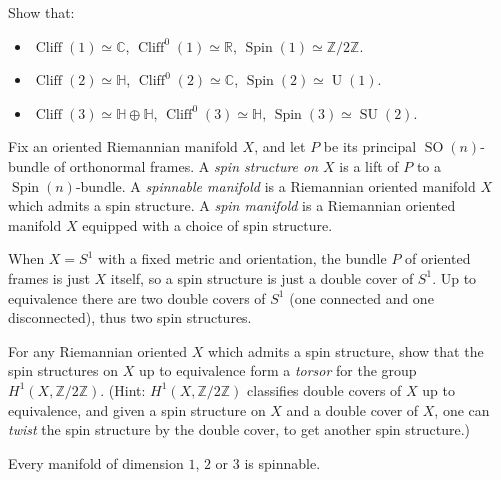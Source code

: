 \documentclass[12pt,letterpaper,reqno]{article}
\numberwithin{equation}{section}
\newcommand{\R}{\ensuremath{\mathbb R}}
\newcommand{\C}{\ensuremath{\mathbb C}}
\newcommand{\Z}{\ensuremath{\mathbb Z}}
\newcommand{\bbH}{\ensuremath{\mathbb H}}
\newcommand{\ti}[1]{\textit{#1}}
\DeclareMathOperator{\Spin}{Spin}
\DeclareMathOperator{\SO}{SO}
\DeclareMathOperator{\SU}{SU}
\DeclareMathOperator{\U}{U}
\DeclareMathOperator{\Cliff}{Cliff}
\begin{document}
\begin{exercise} Show that:
\begin{itemize}
\item $\Cliff(1) \simeq \C$, $\Cliff^0(1) \simeq \R$, $\Spin(1) \simeq \Z / 2\Z$.
\item $\Cliff(2) \simeq \bbH$, $\Cliff^0(2) \simeq \C$, $\Spin(2) \simeq \U(1)$.
\item $\Cliff(3) \simeq \bbH \oplus \bbH$, $\Cliff^0(3) \simeq \bbH$, $\Spin(3) \simeq \SU(2)$.
\end{itemize}
\end{exercise}

\begin{defn} Fix an oriented Riemannian manifold $X$, 
and let $P$ be its principal $\SO(n)$-bundle
of orthonormal frames. A \ti{spin structure on $X$} is a lift of $P$ to a $\Spin(n)$-bundle.
A \ti{spinnable manifold} is a Riemannian oriented manifold $X$ which
admits a spin structure.
A \ti{spin manifold} is a Riemannian oriented manifold $X$ 
equipped with a choice of spin structure.
\end{defn}

\begin{example} When $X = S^1$ with a fixed metric and orientation, 
the bundle $P$ of oriented frames is just $X$ itself, so a spin structure is just a double cover
of $S^1$. Up to equivalence there are two double covers of $S^1$ (one connected and one disconnected),
thus two spin structures.
\end{example}

\begin{exercise}
For any Riemannian oriented $X$ which admits a spin structure, 
show that the spin structures on $X$
up to equivalence form a \ti{torsor} for the group $H^1(X, \Z/2\Z)$.
(Hint: $H^1(X, \Z/2\Z)$ classifies double covers of $X$ up to equivalence, and 
given a spin structure on $X$ and a double cover of $X$, one can \ti{twist} the
spin structure by the double cover, to get another spin structure.)
\end{exercise}

\begin{prop} Every manifold of dimension $1$, $2$ or $3$ is spinnable.
\end{prop}
\end{document}
